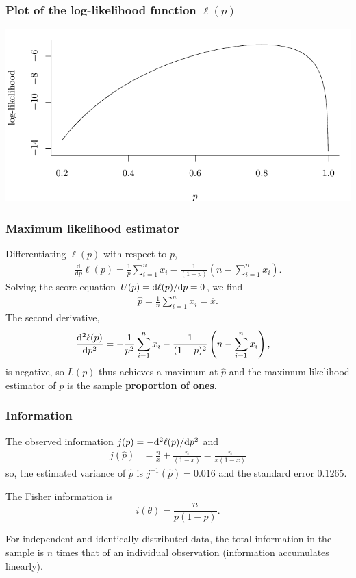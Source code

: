 \documentclass{beamer}
\begin{document}
\begin{frame}
\frametitle{Plot of the log-likelihood function $\ell(p)$}

\begin{center}
\includegraphics[width = \linewidth]{img/c3/05-loglikelihood.pdf}
\end{center}
\end{frame}

\begin{frame}
\frametitle{Maximum likelihood estimator}
Differentiating $\ell(p)$ with respect to $p$,
\begin{align*}
\frac{\mathrm{d}}{\mathrm{d}p} \ell(p)=\frac{1}{p} \sum_{i=1}^n x_i-\frac{1}{(1-p)}\left(n-\sum_{i=1}^n x_i \right).
\end{align*}
Solving the score equation $U(p)=\mathrm{d} \ell(p)/\mathrm{d} p
 =0$, we find
\begin{align*}
\widehat{p}=\frac{1}{n} \sum_{i=1}^n x_i = \overline{x}.
\end{align*}
The second derivative,
\begin{align*}
  \frac{\mathrm{d}^2 \ell(p)}{\mathrm{d} p^2} &= -\frac{1}{p^2} \sum_{i=1}^n x_i-\frac{1}{(1-p)^2}\left(n-\sum_{i=1}^n x_i \right),   
\end{align*}
is negative, so $L(p)$ thus achieves a maximum at $\widehat{p}$ and the maximum likelihood estimator of $p$ is the sample \textbf{proportion of ones}.
\end{frame}

\begin{frame}
 \frametitle{Information}
 The observed information $j(p) = - \mathrm{d}^2 \ell(p)/\mathrm{d} p^2$ and 
 \begin{align*}
j(\widehat{p}) &= \frac{n}{\overline{x}} + \frac{n}{(1-\overline{x})} = \frac{n}{\overline{x}(1-\overline{x})}  
\end{align*}
so, the estimated variance of $\widehat{p}$ is $j^{-1}(\widehat{p}) = 0.016$ and the standard error $0.1265$.

The Fisher information is 
\[
i(\theta) = \frac{n}{p(1-p)}.
\]
\bi \item For independent and identically distributed data, the total information in the sample is $n$ times that of an individual observation (information accumulates linearly).
\ei
\end{frame}
\end{document}
